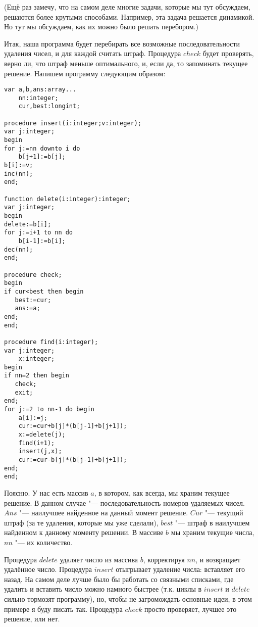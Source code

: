 (Ещё раз замечу, что на самом деле многие задачи, которые мы тут обсуждаем, решаются более крутыми 
способами. Например, эта задача решается динамикой. Но тут мы обсуждаем, как их можно было 
решать перебором.)

Итак, наша программа будет перебирать все возможные последовательности удаления чисел, и для 
каждой считать штраф. Процедура $check$ будет проверять, верно ли, что штраф меньше 
оптимального, и, если да, то запоминать текущее решение. Напишем программу следующим образом:

\begin{codesample}\begin{verbatim}
var a,b,ans:array...
    nn:integer;
    cur,best:longint;

procedure insert(i:integer;v:integer);
var j:integer;
begin
for j:=nn downto i do
    b[j+1]:=b[j];
b[i]:=v;
inc(nn);
end;

function delete(i:integer):integer;
var j:integer;
begin
delete:=b[i];
for j:=i+1 to nn do
    b[i-1]:=b[i];
dec(nn);
end;

procedure check;
begin
if cur<best then begin
   best:=cur;
   ans:=a;
end;
end;

procedure find(i:integer);
var j:integer;
    x:integer;
begin
if nn=2 then begin
   check;
   exit;
end;
for j:=2 to nn-1 do begin
    a[i]:=j;
    cur:=cur+b[j]*(b[j-1]+b[j+1]);
    x:=delete(j);
    find(i+1);
    insert(j,x);
    cur:=cur-b[j]*(b[j-1]+b[j+1]);
end;
end;
\end{verbatim}
\end{codesample}

Поясню. У нас есть массив $a$, в котором, как всегда, мы храним текущее решение. В
данном случае "--- последовательность номеров удаляемых чисел. $Ans$ "--- наилучшее
найденное на данный момент решение. $Cur$ "--- текущий штраф (за те удаления,
которые мы уже сделали), $best$ "--- штраф в наилучшем найденном к данному моменту
решении. В массиве $b$ мы храним текущие числа, $nn$ "--- их количество. 

Процедура
$delete$ удаляет число из массива $b$, корректируя $nn$, и возвращает удалённое число.
Процедура $insert$ отыгрывает удаление числа: вставляет его назад. На самом деле
лучше было бы работать со связными списками, где удалить и вставить число можно
намного быстрее (т.к. циклы в $insert$ и $delete$ сильно тормозят
программу), но, чтобы не загромождать основные идеи, в этом примере я буду
писать так. Процедура $check$ просто проверяет, лучшее это решение, или нет. 

